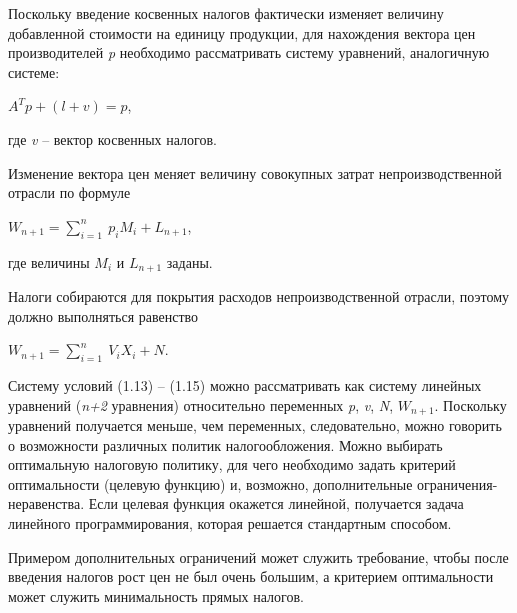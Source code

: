 \documentclass[12pt, 4paper]{book}
\begin{document}
{\par
\hspace{0.5cm}
Поскольку введение косвенных налогов фактически изменяет величину добавленной стоимости на единицу продукции, для нахождения вектора цен производителей \textit{p} необходимо рассматривать систему уравнений, аналогичную системе:
\begin{center}
	$A^Tp + (l + v) = p$,
\end{center}
где \textit{v} – вектор косвенных налогов.
\par
\hspace{0.5cm}
Изменение вектора цен меняет величину совокупных затрат непроизводственной отрасли по формуле
\begin{center}
	$W_{n+1} = \sum\limits_{i=1}^n \: p_iM_i + L_{n+1}$,
\end{center}
где величины $M_i$ и $L_{n+1}$ заданы.
\par
\hspace{0.5cm}
Налоги собираются для покрытия расходов непроизводственной отрасли, поэтому должно выполняться равенство
\begin{center}
	$W_{n+1} = \sum\limits_{i=1}^n \: V_iX_i + N$.
\end{center}
\par
\hspace{0.5cm}
Систему условий (1.13) – (1.15) можно рассматривать как систему линейных уравнений (\textit{n+2} уравнения) относительно переменных 
\textit{p}, \textit{v}, \textit{N},  $W_{n+1}$. Поскольку уравнений получается меньше, чем переменных, следовательно, можно говорить о возможности различных политик налогообложения. Можно выбирать оптимальную налоговую политику, для чего необходимо задать критерий оптимальности (целевую функцию) и, возможно, дополнительные ограничения-неравенства. Если целевая функция окажется линейной, получается задача линейного программирования, которая решается стандартным способом.
\par
\hspace{0.5cm}
Примером дополнительных ограничений может служить требование, чтобы после введения налогов рост цен не был очень большим, а критерием оптимальности может служить минимальность прямых налогов.
}
\end{document}
